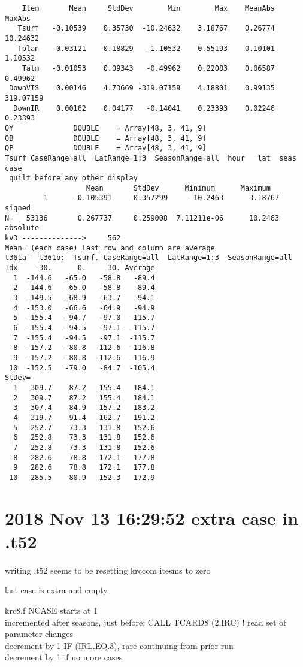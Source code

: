\documentclass{article}
\begin{document}
\begin{verbatim}
    Item       Mean     StdDev        Min        Max    MeanAbs     MaxAbs
   Tsurf   -0.10539    0.35730  -10.24632    3.18767    0.26774   10.24632
   Tplan   -0.03121    0.18829   -1.10532    0.55193    0.10101    1.10532
    Tatm   -0.01053    0.09343   -0.49962    0.22083    0.06587    0.49962
 DownVIS    0.00146    4.73669 -319.07159    4.18801    0.99135  319.07159
  DownIR    0.00162    0.04177   -0.14041    0.23393    0.02246    0.23393
QY              DOUBLE    = Array[48, 3, 41, 9]
QB              DOUBLE    = Array[48, 3, 41, 9]
QP              DOUBLE    = Array[48, 3, 41, 9]
Tsurf CaseRange=all  LatRange=1:3  SeasonRange=all  hour   lat  seas  case
 quilt before any other display
                   Mean       StdDev      Minimum      Maximum
         1      -0.105391     0.357299     -10.2463      3.18767  signed
N=   53136       0.267737     0.259008  7.11211e-06      10.2463  absolute
kv3 -------------->     562
Mean= (each case) last row and column are average
t361a - t361b:  Tsurf. CaseRange=all  LatRange=1:3  SeasonRange=all
Idx    -30.      0.     30. Average
  1  -144.6   -65.0   -58.8   -89.4
  2  -144.6   -65.0   -58.8   -89.4
  3  -149.5   -68.9   -63.7   -94.1
  4  -153.0   -66.6   -64.9   -94.9
  5  -155.4   -94.7   -97.0  -115.7
  6  -155.4   -94.5   -97.1  -115.7
  7  -155.4   -94.5   -97.1  -115.7
  8  -157.2   -80.8  -112.6  -116.8
  9  -157.2   -80.8  -112.6  -116.9
 10  -152.5   -79.0   -84.7  -105.4
StDev=
  1   309.7    87.2   155.4   184.1
  2   309.7    87.2   155.4   184.1
  3   307.4    84.9   157.2   183.2
  4   319.7    91.4   162.7   191.2
  5   252.7    73.3   131.8   152.6
  6   252.8    73.3   131.8   152.6
  7   252.8    73.3   131.8   152.6
  8   282.6    78.8   172.1   177.8
  9   282.6    78.8   172.1   177.8
 10   285.5    80.9   152.3   172.9
\end{verbatim} 
 
\section{2018 Nov 13 16:29:52  extra case in .t52}
 writing .t52 seems to be resetting krccom itesms to zero

last case is extra and empty.

krc8.f NCASE starts at 1
\\ incremented after seasons, just before: CALL TCARD8 (2,IRC)       ! read set of parameter changes
\\  decrement by 1 IF (IRL.EQ.3), rare continuing from prior run
\\ decrement by 1 if no more cases
\end{document}
